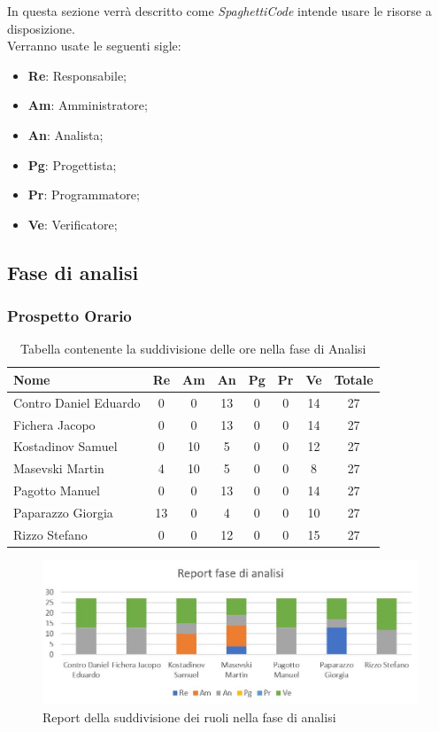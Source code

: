 \documentclass[../piano_di_progetto.tex]{subfiles}
\begin{document}
In questa sezione verrà descritto come \emph{SpaghettiCode} intende usare le risorse a disposizione. \\
Verranno usate le seguenti sigle:\par
\begin{itemize}
\item \textbf{Re}: Responsabile;
\item \textbf{Am}: Amministratore;
\item \textbf{An}: Analista;
\item \textbf{Pg}: Progettista;
\item \textbf{Pr}: Programmatore;
\item \textbf{Ve}: Verificatore;
\end{itemize}


\subsection{ Fase di analisi}%
\label{sub:fase_analisi}
\subsubsection{Prospetto Orario}


\begin{table}[!ht]
	\centering
	\begin{tabular}{|l|c|c|c|c|c|c|c|}
	\hline
	\rowcolor{lightgray}
	\textbf{Nome} & \textbf{Re} & \textbf{Am} & \textbf{An} & \textbf{Pg}  & \textbf{Pr}   & \textbf{Ve} & \textbf{Totale}\\
	\hline
		Contro Daniel Eduardo & 0 & 0 & 13 & 0 & 0 & 14 & 27 \\
		Fichera Jacopo & 0 & 0 & 13 & 0 & 0 & 14 & 27 \\
		Kostadinov Samuel & 0 & 10 & 5 & 0 & 0 & 12 & 27 \\			
		Masevski Martin & 4 & 10 & 5 & 0 & 0 & 8 & 27 \\
		Pagotto Manuel & 0 & 0 & 13 & 0 & 0 & 14 & 27 \\			
		Paparazzo Giorgia & 13 & 0 & 4 & 0 & 0 & 10 & 27 \\
		Rizzo Stefano & 0 & 0 & 12 & 0 & 0 & 15 & 27 \\
	\hline	
	\end{tabular}
	\caption{Tabella contenente la suddivisione delle ore nella fase di Analisi}
\end{table}

\begin{figure}[H]
\centering
\includegraphics[width=12cm]{componenti/img/report_analisi}
\caption{Report della suddivisione dei ruoli nella fase di analisi}
\end{figure}
\end{document}
